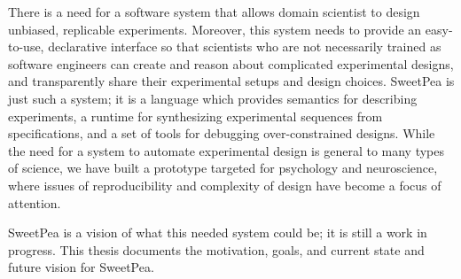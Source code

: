 There is a need for a software system that allows domain scientist to design unbiased, replicable experiments. Moreover, this system needs to provide an easy-to-use, declarative interface so that scientists who are not necessarily trained as software engineers can create and reason about complicated experimental designs, and transparently share their experimental setups and design choices. SweetPea is just such a system; it is a language which provides semantics for describing experiments, a runtime for synthesizing experimental sequences from specifications, and a set of tools for debugging over-constrained designs. While the need for a system to automate experimental design is general to many types of science, we have built a prototype targeted for psychology and neuroscience, where issues of reproducibility and complexity of design have become a focus of attention.

SweetPea is a vision of what this needed system could be; it is still a work in progress. This thesis documents the motivation, goals, and current state and future vision for SweetPea.




